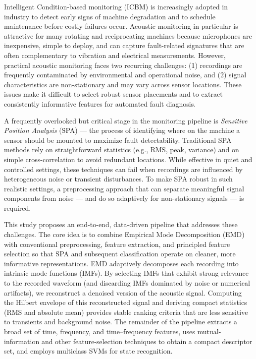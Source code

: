 \documentclass[12pt,a4paper]{article}
\begin{document}
Intelligent Condition-based monitoring (ICBM) is increasingly adopted in industry to detect early signs of machine degradation and to schedule maintenance before costly failures occur. Acoustic monitoring in particular is attractive for many rotating and reciprocating machines because microphones are inexpensive, simple to deploy, and can capture fault-related signatures that are often complementary to vibration and electrical measurements. However, practical acoustic monitoring faces two recurring challenges: (1) recordings are frequently contaminated by environmental and operational noise, and (2) signal characteristics are non-stationary and may vary across sensor locations. These issues make it difficult to select robust sensor placements and to extract consistently informative features for automated fault diagnosis.

A frequently overlooked but critical stage in the monitoring pipeline is \emph{Sensitive Position Analysis} (SPA) — the process of identifying where on the machine a sensor should be mounted to maximize fault detectability. Traditional SPA methods rely on straightforward statistics (e.g., RMS, peak, variance) and on simple cross-correlation to avoid redundant locations. While effective in quiet and controlled settings, these techniques can fail when recordings are influenced by heterogeneous noise or transient disturbances. To make SPA robust in such realistic settings, a preprocessing approach that can separate meaningful signal components from noise — and do so adaptively for non-stationary signals — is required.

This study proposes an end-to-end, data-driven pipeline that addresses these challenges. The core idea is to combine Empirical Mode Decomposition (EMD) with conventional preprocessing, feature extraction, and principled feature selection so that SPA and subsequent classification operate on cleaner, more informative representations. EMD adaptively decomposes each recording into intrinsic mode functions (IMFs). By selecting IMFs that exhibit strong relevance to the recorded waveform (and discarding IMFs dominated by noise or numerical artifacts), we reconstruct a denoised version of the acoustic signal. Computing the Hilbert envelope of this reconstructed signal and deriving compact statistics (RMS and absolute mean) provides stable ranking criteria that are less sensitive to transients and background noise. The remainder of the pipeline extracts a broad set of time, frequency, and time–frequency features, uses mutual-information and other feature-selection techniques to obtain a compact descriptor set, and employs multiclass SVMs for state recognition.
\end{document}

